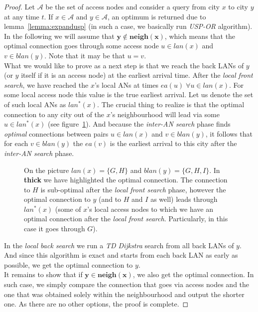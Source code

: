 		\begin{proof}
			Let $\mathcal{A}$ be the set of access nodes and consider a query from city $x$ to city $y$ at any time $t$. If $x \in \mathcal{A}$ and $y \in \mathcal{A}$, an optimum is returned due to lemma~\ref{lemma:expandusp} (in such a case, we basically run \textit{USP-OR} algorithm). \\
			
			\noindent In the following we will assume that $\bm{y \not \in neigh(x)}$, which means that the optimal connection goes through some access node $u \in lan(x)$ and $v \in blan(y)$. Note that it may be that $u = v$. \\
			
			\noindent What we would like to prove as a next step is that we reach the back LANs of $y$ (or $y$ itself if it is an access node) at the earliest arrival time. After the \textit{local front search}, we have reached the $x$'s local ANs at times $ea(u) \; \forall u \in lan(x)$. For some local access node this value is the true earliest arrival. Let us denote the set of such local ANs as $lan^{*}(x)$. The crucial thing to realize is that the optimal connection to any city out of the $x$'s neighbourhood will lead via some $u \in lan^{*}(x)$ (see figure~\ref{fig:usporaproof2}). And because the \textit{inter-AN search} phase finds \textit{optimal} connections between pairs $u \in lan(x)$ and $v \in blan(y)$, it follows that for each $v \in blan(y)$ the $ea(v)$ is the earliest arrival to this city after the \textit{inter-AN search} phase.
			
			\begin{figure}[h!]
				\begin{center}
				\end{center}
				\caption{\label{fig:usporaproof2} On the picture $lan(x) = \{G, H\}$ and $blan(y) = \{G, H, I\}$. In \textbf{thick} we have highlighted the optimal connection. The connection to $H$ is sub-optimal after the \textit{local front search} phase, however the optimal connection to $y$ (and to $H$ and $I$ as well) leads through $lan^{*}(x)$ (some of $x$'s local access nodes to which we have an optimal connection after the \textit{local front search}. Particularly, in this case it goes through $G$).}
			\end{figure}
			
			\noindent In the \textit{local back search} we run a \textit{TD Dijkstra} search from all back LANs of $y$. And since this algorithm is exact and starts from each back LAN as early as possible, we get the optimal connection to $y$. \\
			
			\noindent It remains to show that if $\bm{y \in neigh(x)}$, we also get the optimal connection. In such case, we simply compare the connection that goes via access nodes and the one that was obtained solely within the neighbourhood and output the shorter one. As there are no other options, the proof is complete.
		\end{proof}
	
